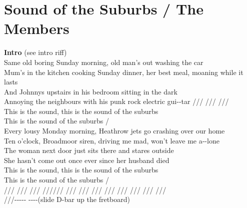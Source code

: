 \section{Sound of the Suburbs / The Members}\label{sec:soundofthesuburbs}

\Amajor
\Aminor
\Bmajor
\Cmajor
\Cfive
\DmajorEasy
\EmajorEasy
\Gmajor

\textbf{Intro}     (see intro riff)\\
 Same old boring Sunday morning, old man's out washing the  car\\
 Mum's in the kitchen cooking Sunday dinner, her best meal, moaning while it lasts\\
 And Johnnys  upstairs in his  bedroom sitting in the dark\\
 Annoying the  neighbours with his  punk rock electric gui--tar ///  ///  /// \\
This is the  sound, this is the  sound of the  suburbs\\
 This is the  sound of the  suburbs  /  \\
 Every lousy Monday morning, Heathrow jets go crashing over our  home\\
 Ten o'clock, Broadmoor siren, driving me mad, won't leave me a--lone\\
 The woman  next door just  sits there and stares outside\\
 She hasn't  come out once ever  since her husband died\\
This is the  sound, this is the  sound of the  suburbs\\
 This is the  sound of the  suburbs  /  \\
 /// /// /// ////// /// /// /// /// /// /// /// ///\\
///-----  ----(slide D-bar up the fretboard)\\
